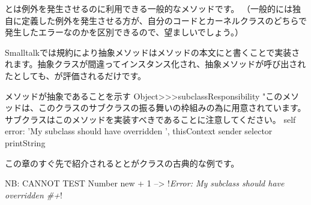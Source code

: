 \documentclass[a4paper,10pt,twoside]{book}
\begin{document}

とは例外を発生させるのに利用できる一般的なメソッドです。
（一般的には独自に定義した例外を発生させる方が、自分のコードとカーネルクラスのどちらで発生したエラーなのかを区別できるので、望ましいでしょう。）

Smalltalkでは規約により抽象メソッドはメソッドの本文にと書くことで実装されます。抽象クラスが間違ってインスタンス化され、抽象メソッドが呼び出されたとしても、が評価されるだけです。

\begin{method}{メソッドが抽象であることを示す}
Object>>>subclassResponsibility
    "このメソッドは、このクラスのサブクラスの振る舞いの枠組みの為に用意されています。
    サブクラスはこのメソッドを実装すべきであることに注意してください。
    self error: 'My subclass should have overridden ', thisContext sender selector printString
\end{method}

この章のすぐ先で紹介されるととがクラスの古典的な例です。

\begin{code}{NB: CANNOT TEST}
Number new + 1 --> !\emph{Error: My subclass should have overridden \#+}!
\end{code}
\end{document}
